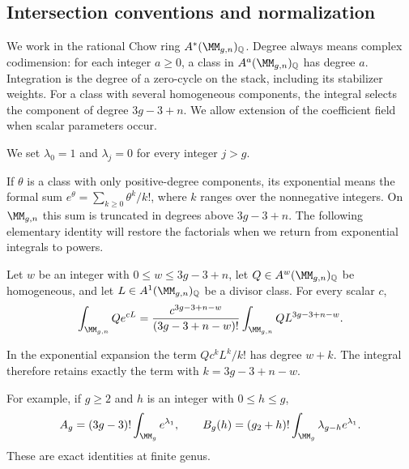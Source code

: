 \subsection{Intersection conventions and normalization}
\label{subsec:s02:01}

We work in the rational Chow ring
$A^*(\MM_{g,n})_{\mathbb Q}$.  Degree always means complex codimension:
for each integer $a\geq0$, a class in
$A^a(\MM_{g,n})_{\mathbb Q}$ has degree $a$.  Integration is the degree of a
zero-cycle on the stack, including its stabilizer weights.  For a class
with several homogeneous components, the integral selects the component
of degree $3g-3+n$.  We allow extension of the coefficient field when
scalar parameters occur.

We set $\lambda_0=1$ and $\lambda_j=0$ for every integer $j>g$.

If $\theta$ is a class with only positive-degree components, its
exponential means the formal sum
$e^\theta=\sum_{k\geq0}\theta^k/k!$, where $k$ ranges over the
nonnegative integers.  On $\MM_{g,n}$ this sum is truncated in degrees
above $3g-3+n$.  The following elementary identity will restore the
factorials when we return from exponential integrals to powers.

\begin{lmm}
\label{lmm:s02:exp-to-power}
Let $w$ be an integer with $0\leq w\leq3g-3+n$, let
$Q\in A^w(\MM_{g,n})_{\mathbb Q}$ be homogeneous, and let
$L\in A^1(\MM_{g,n})_{\mathbb Q}$ be a divisor class.  For every scalar
$c$,
\begin{equation}
\label{eq:s02:exp-to-power}
\int_{\MM_{g,n}}Qe^{cL}
=\frac{c^{3g-3+n-w}}{(3g-3+n-w)!}
  \int_{\MM_{g,n}}QL^{3g-3+n-w}.
\end{equation}
\end{lmm}

\begin{prf}
In the exponential expansion the term $Qc^kL^k/k!$ has degree $w+k$.
The integral therefore retains exactly the term with
$k=3g-3+n-w$.
\end{prf}

For example, if $g\geq2$ and $h$ is an integer with $0\leq h\leq g$,
\begin{equation}
\label{eq:s02:hodge-factorials}
A_g=(3g-3)!\int_{\MM_g}e^{\lambda_1},
\qquad
B_g(h)=(g_2+h)!\int_{\MM_g}\lambda_{g-h}e^{\lambda_1}.
\end{equation}
These are exact identities at finite genus.

